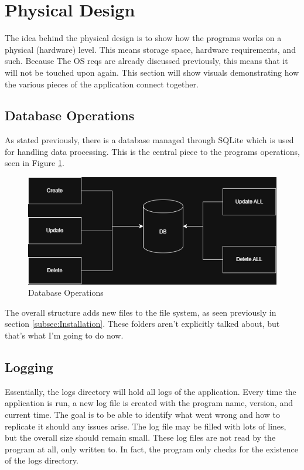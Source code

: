 \section{Physical Design}

The idea behind the physical design is to show how the programs works
on a physical (hardware) level. This means storage space, hardware
requirements, and such. Because The OS reqs are already discussed
previously, this means that it will not be touched upon again. This
section will show visuals demonstrating how the various pieces of the
application connect together.

\subsection{Database Operations}

As stated previously, there is a database managed through SQLite
which is used for handling data processing. This is the central piece
to the programs operations, seen in Figure \ref{fig:DBOperations}.

\begin{figure}[htb]
	\centering
	\includegraphics[width=14cm]{./Images/DBOps.png}
	\caption{Database Operations}
	\label{fig:DBOperations}
\end{figure}

The overall structure adds new files to the file system, as seen
previously in section \ref{subsec:Installation}. These folders aren't
explicitly talked about, but that's what I'm going to do now.

\subsection{Logging}

Essentially, the logs directory will hold all logs of the
application. Every time the application is run, a new log file is
created with the program name, version, and current time. The goal is
to be able to identify what went wrong and how to replicate it should
any issues arise. The log file may be filled with lots of lines, but
the overall size should remain small. These log files are not read by
the program at all, only written to. In fact, the program only checks
for the existence of the logs directory.

